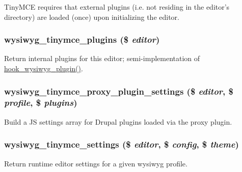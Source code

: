 TinyMCE requires that external plugins (i.e. not residing in the editor's directory) are loaded (once) upon initializing the editor. \hypertarget{tinymce_8inc_ad2b3ed45661a78cc4ec8bb66c54c4a6c}{
\subsubsection[{wysiwyg\_\-tinymce\_\-plugins}]{\setlength{\rightskip}{0pt plus 5cm}wysiwyg\_\-tinymce\_\-plugins (\$ {\em editor})}}
\label{tinymce_8inc_ad2b3ed45661a78cc4ec8bb66c54c4a6c}
Return internal plugins for this editor; semi-\/implementation of \hyperlink{wysiwyg_8api_8php_abad2b35b32be0b20d73006b73205045c}{hook\_\-wysiwyg\_\-plugin()}. \hypertarget{tinymce_8inc_a8a7984820a5db3e3db37f2e88d7b155b}{
\subsubsection[{wysiwyg\_\-tinymce\_\-proxy\_\-plugin\_\-settings}]{\setlength{\rightskip}{0pt plus 5cm}wysiwyg\_\-tinymce\_\-proxy\_\-plugin\_\-settings (\$ {\em editor}, \/  \$ {\em profile}, \/  \$ {\em plugins})}}
\label{tinymce_8inc_a8a7984820a5db3e3db37f2e88d7b155b}
Build a JS settings array for Drupal plugins loaded via the proxy plugin. \hypertarget{tinymce_8inc_ad053d3f07a709b88d646ec81bd16fd94}{
\subsubsection[{wysiwyg\_\-tinymce\_\-settings}]{\setlength{\rightskip}{0pt plus 5cm}wysiwyg\_\-tinymce\_\-settings (\$ {\em editor}, \/  \$ {\em config}, \/  \$ {\em theme})}}
\label{tinymce_8inc_ad053d3f07a709b88d646ec81bd16fd94}
Return runtime editor settings for a given wysiwyg profile.


